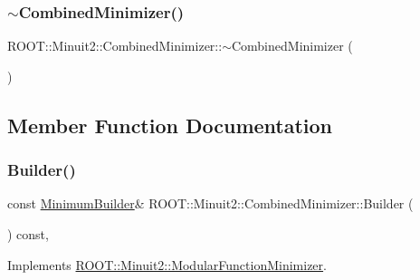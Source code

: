 \mbox{\label{classROOT_1_1Minuit2_1_1CombinedMinimizer_a09de1afbff4418ffaf7b94e625243cd1}} 
\subsubsection{\texorpdfstring{$\sim$CombinedMinimizer()}{~CombinedMinimizer()}\hspace{0.1cm}{\footnotesize\ttfamily [3/3]}}
{\footnotesize\ttfamily R\+O\+O\+T\+::\+Minuit2\+::\+Combined\+Minimizer\+::$\sim$\+Combined\+Minimizer (\begin{DoxyParamCaption}{ }\end{DoxyParamCaption})\hspace{0.3cm}{\ttfamily [inline]}}



\subsection{Member Function Documentation}
\mbox{\label{classROOT_1_1Minuit2_1_1CombinedMinimizer_a73befc9c0bdfe8c9f09638505772c5ed}} 
\subsubsection{\texorpdfstring{Builder()}{Builder()}\hspace{0.1cm}{\footnotesize\ttfamily [1/3]}}
{\footnotesize\ttfamily const \mbox{\hyperlink{classROOT_1_1Minuit2_1_1MinimumBuilder}{Minimum\+Builder}}\& R\+O\+O\+T\+::\+Minuit2\+::\+Combined\+Minimizer\+::\+Builder (\begin{DoxyParamCaption}{ }\end{DoxyParamCaption}) const\hspace{0.3cm}{\ttfamily [inline]}, {\ttfamily [virtual]}}



Implements \mbox{\hyperlink{classROOT_1_1Minuit2_1_1ModularFunctionMinimizer_a13e98551cf14e927c61e1e34ecf8ba8b}{R\+O\+O\+T\+::\+Minuit2\+::\+Modular\+Function\+Minimizer}}.

